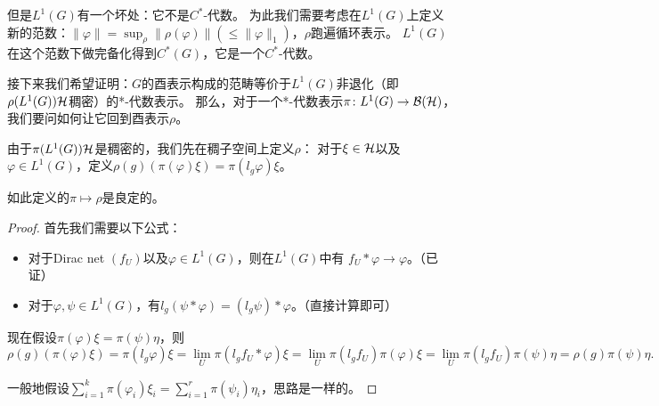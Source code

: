 但是$L^1(G)$有一个坏处：它不是$C^*$-代数。
为此我们需要考虑在$L^1(G)$上定义新的范数：$\|\varphi\| = \sup_{\rho}\|\rho(\varphi)\| (\leqslant \|\varphi\|_1)$，$\rho$跑遍循环表示。
$L^1(G)$在这个范数下做完备化得到$C^*(G)$，它是一个$C^*$-代数。

接下来我们希望证明：$G$的酉表示构成的范畴等价于$L^1(G)$非退化（即$\rho(L^1(G))\mathcal{H}$稠密）的*-代数表示。
那么，对于一个*-代数表示$\pi \colon L^1(G) \to \mathcal{B}(\mathcal{H})$，我们要问如何让它回到酉表示$\rho$。

由于$\pi(L^1(G))\mathcal{H}$是稠密的，我们先在稠子空间上定义$\rho$：
对于$\xi \in \mathcal{H}$以及$\varphi \in L^1(G)$，定义$\rho(g)(\pi(\varphi)\xi) = \pi(l_g\varphi)\xi$。
\begin{lemma}
    如此定义的$\pi \mapsto \rho$是良定的。
\end{lemma}
\begin{proof}
    首先我们需要以下公式：
    \begin{itemize}
        \item 对于Dirac net $(f_U)$以及$\varphi \in L^1(G)$，则在$L^1(G)$中有
        $f_U * \varphi \to \varphi$。（已证）
        \item 对于$\varphi,\psi \in L^1(G)$，有$l_g(\psi * \varphi) = (l_g \psi) * \varphi$。（直接计算即可）
    \end{itemize}

    现在假设$\pi(\varphi)\xi = \pi(\psi)\eta$，则\[\rho(g)(\pi(\varphi)\xi) = \pi(l_g\varphi)\xi 
     = \lim_U \pi(l_gf_U * \varphi)\xi = \lim_U \pi(l_gf_U)\pi(\varphi)\xi = \lim_U \pi(l_gf_U)\pi(\psi)\eta
      = \rho(g)\pi(\psi)\eta.\]

    一般地假设$\sum_{i=1}^k \pi(\varphi_i)\xi_i = \sum_{i=1}^r \pi(\psi_i)\eta_i$，思路是一样的。
\end{proof}

